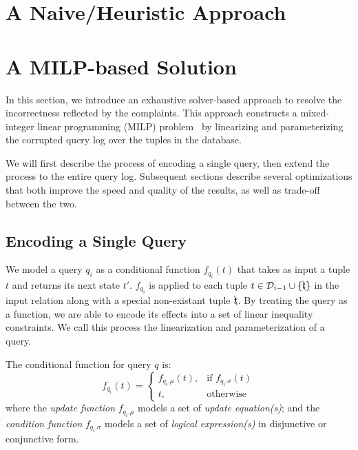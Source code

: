 \section{A Naive/Heuristic Approach}




\section{A MILP-based Solution}
\label{sec:sol}
In this section, we introduce an exhaustive solver-based approach to 
resolve the incorrectness reflected by the complaints. 
This approach constructs a mixed-integer linear 
programming (MILP) problem~\cite{milp} by linearizing and parameterizing the 
corrupted query log over the tuples in the database. 
{}


We will first describe the process of encoding a single query,
then extend the process to the entire query log.
Subsequent sections describe several optimizations that  both
improve the speed and quality of the results, as well as trade-off between the two. 




\subsection{Encoding a Single Query}%
\label{sec:linearize}

We model a query $q_i$ as a conditional function $f_{q_i}(t)$ that takes as input a tuple $t$
and returns its next state $t'$.  $f_{q_i}$ is applied to each 
tuple $t \in \mathcal{D}_{i-1} \cup \{\bcancel{t}\}$ in the input relation along with a special
non-existant tuple $\bcancel{t}$. 
By treating the query as a function, we are able to encode its effects into a set
of linear inequality constraints.  We call this process the linearization and 
parameterization of a query.

\begin{definition} 
\label{def:cond}
	The conditional function for query $q$ is:
	\[
    f_{q_i}(t)= 
    \begin{cases}
    f_{q_i.\mu} (t) ,& \text{if } f_{q_i.\sigma} (t)\\
    t,              & \text{otherwise}
    \end{cases}
\]
where the \textit{update function} $f_{q_i.\mu}$ models a set of \textit{update equation(s)};
and the \textit{condition function} $f_{q_i.\sigma}$ models a set of \textit{logical expression(s)} in 
disjunctive or conjunctive form.
\end{definition} 


